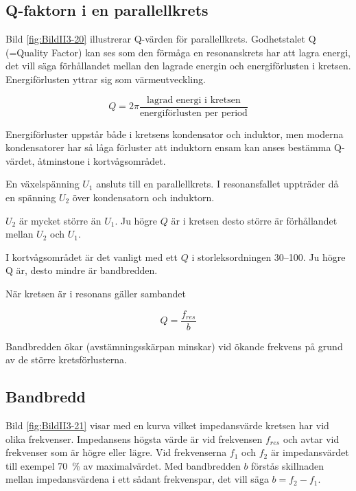 \subsection{Q-faktorn i en parallellkrets}
\label{Q-faktor}


Bild \ref{fig:BildII3-20} illustrerar Q-värden för parallellkrets.
Godhetstalet Q (=Quality Factor) kan ses som den förmåga en resonanskrets har
att lagra energi, det vill säga förhållandet mellan den lagrade energin och
energiförlusten i kretsen.
Energiförlusten yttrar sig som värmeutveckling.

\[
Q = 2\pi \frac{\text{lagrad energi i kretsen}}{\text{energiförlusten per period}}
\]

Energiförluster uppstår både i kretsens kondensator och induktor, men moderna
kondensatorer har så låga förluster att induktorn ensam kan anses bestämma
Q-värdet, åtminstone i kortvågsområdet.

En växelspänning \(U_1\) ansluts till en parallellkrets.
I resonansfallet uppträder då en spänning \(U_2\) över kondensatorn och
induktorn.

\(U_2\) är mycket större än \(U_1\).
Ju högre \(Q\) är i kretsen desto större är förhållandet mellan \(U_2\) och
\(U_1\).

I kortvågsområdet är det vanligt med ett \(Q\) i storleksordningen 30--100.
Ju högre Q är, desto mindre är bandbredden.

När kretsen är i resonans gäller sambandet

\[Q = \frac{f_{res}}{b}\]

Bandbredden ökar (avstämningsskärpan minskar) vid ökande frekvens på grund av de
större kretsförlusterna.


\subsection{Bandbredd}

Bild \ref{fig:BildII3-21} visar med en kurva vilket impedansvärde kretsen har
vid olika frekvenser.
Impedansens högsta värde är vid frekvensen \(f_{res}\) och avtar vid frekvenser
som är högre eller lägre.
Vid frekvenserna \(f_1\) och \(f_2\) är impedansvärdet till exempel 70~\% av
maximalvärdet.
Med bandbredden \(b\) förstås skillnaden mellan impedansvärdena i ett sådant
frekvenspar, det vill säga \(b = f_2 - f_1\).
